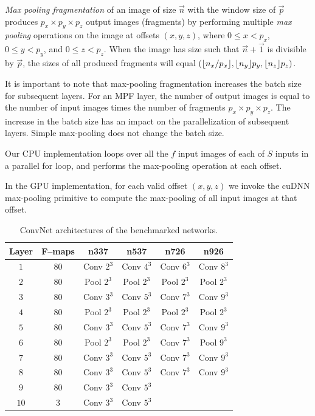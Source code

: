 \documentclass[conference]{./IEEEtran/IEEEtran}
\DeclarePairedDelimiter{\floor}{\lfloor}{\rfloor}
\begin{document}
  \emph{Max pooling fragmentation} of an image of size $\vec{n}$ with the
  window size of $\vec{p}$ produces $p_x \times p_y \times p_z$ output
  images (fragments) by performing multiple \emph{max pooling}
  operations on the image at offsets $(x,y,z)$, where $0 \le x < p_x$,
  $0 \le y < p_y$, and $0 \le z < p_z$.  When the image has size such
  that $\vec{n} + \vec{1}$ is divisible by $\vec{p}$, the sizes of all
  produced fragments will equal
  $(\floor{n_x/p_x},\floor{n_y}{p_y},\floor{n_z}{p_z})$.

  It is important to note that max-pooling fragmentation increases the
  batch size for subsequent layers.  For an MPF layer, the number of
  output images is equal to the number of input images times the
  number of fragments $p_x \times p_y \times p_z$.  The increase in
  the batch size has an impact on the parallelization of subsequent
  layers.  Simple max-pooling does not change the batch size.

  Our CPU implementation loops over all the $f$ input images of each
  of $S$ inputs in a parallel for loop, and performs the max-pooling
  operation at each offset.

  In the GPU implementation, for each valid offset $(x,y,z)$ we invoke
  the cuDNN max-pooling primitive to compute the max-pooling of all
  input images at that offset.

  \begin{table}
    {\footnotesize
    \centering
    \begin{tabular}{cccccc}
      \toprule
      Layer & F--maps & n337    & n537  &  n726  &  n926 \\
      \midrule
      $1$ & 80 &  Conv $2^3$  & Conv $4^3$  & Conv $6^3$  & Conv $8^3$ \\
      $2$ & 80 &  Pool $2^3$  & Pool $2^3$  & Pool $2^3$  & Pool $2^3$ \\
      $3$ & 80 &  Conv $3^3$  & Conv $5^3$  & Conv $7^3$  & Conv $9^3$ \\
      $4$ & 80 &  Pool $2^3$  & Pool $2^3$  & Pool $2^3$  & Pool $2^3$ \\
      $5$ & 80 &  Conv $3^3$  & Conv $5^3$  & Conv $7^3$  & Conv $9^3$ \\
      $6$ & 80 &  Pool $2^3$  & Pool $2^3$  & Conv $7^3$  & Pool $9^3$ \\
      $7$ & 80 &  Conv $3^3$  & Conv $5^3$  & Conv $7^3$  & Conv $9^3$ \\
      $8$ & 80 &  Conv $3^3$  & Conv $5^3$  & Conv $7^3$  & Conv $9^3$ \\
      $9$ & 80 & Conv $3^3$  & Conv $5^3$  & & \\
      $10$ & 3 & Conv $3^3$  & Conv $5^3$  & & \\
      \bottomrule
    \end{tabular}
    \caption{ConvNet architectures of the benchmarked networks.}
    \label{table:benchmarked_networks}
    }
  \end{table}
\end{document}
